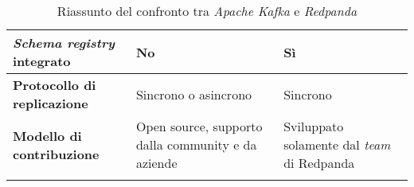 \begin{longtable}{|>{\centering\arraybackslash}p{}|>{\centering\arraybackslash}p{}|>{\centering\arraybackslash}p{}|}
	\hline
	\textbf{\textit{Schema registry} integrato} & No                                                                                                                                                          & Sì                                                                                                                                                                     \\
	\hline
	\textbf{Protocollo di replicazione}         & Sincrono o asincrono                                                                                                                                        & Sincrono                                                                                                                                                               \\
	\hline
	\textbf{Modello di contribuzione}           & Open source, supporto dalla community e da aziende                                                                                                          & Sviluppato solamente dal \textit{team} di Redpanda                                                                                                                     \\
	\hline
	\caption{Riassunto del confronto tra \textit{Apache Kafka} e \textit{Redpanda}}
\end{longtable}





















